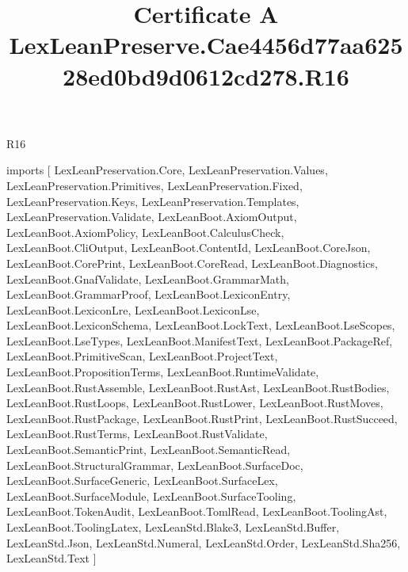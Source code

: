 \begin{lexlean}{R16}
\title{Certificate A LexLeanPreserve.Cae4456d77aa62528ed0bd9d0612cd278.R16}
\begin{coremodule}
imports [
  LexLeanPreservation.Core,
  LexLeanPreservation.Values,
  LexLeanPreservation.Primitives,
  LexLeanPreservation.Fixed,
  LexLeanPreservation.Keys,
  LexLeanPreservation.Templates,
  LexLeanPreservation.Validate,
  LexLeanBoot.AxiomOutput,
  LexLeanBoot.AxiomPolicy,
  LexLeanBoot.CalculusCheck,
  LexLeanBoot.CliOutput,
  LexLeanBoot.ContentId,
  LexLeanBoot.CoreJson,
  LexLeanBoot.CorePrint,
  LexLeanBoot.CoreRead,
  LexLeanBoot.Diagnostics,
  LexLeanBoot.GnafValidate,
  LexLeanBoot.GrammarMath,
  LexLeanBoot.GrammarProof,
  LexLeanBoot.LexiconEntry,
  LexLeanBoot.LexiconLre,
  LexLeanBoot.LexiconLse,
  LexLeanBoot.LexiconSchema,
  LexLeanBoot.LockText,
  LexLeanBoot.LseScopes,
  LexLeanBoot.LseTypes,
  LexLeanBoot.ManifestText,
  LexLeanBoot.PackageRef,
  LexLeanBoot.PrimitiveScan,
  LexLeanBoot.ProjectText,
  LexLeanBoot.PropositionTerms,
  LexLeanBoot.RuntimeValidate,
  LexLeanBoot.RustAssemble,
  LexLeanBoot.RustAst,
  LexLeanBoot.RustBodies,
  LexLeanBoot.RustLoops,
  LexLeanBoot.RustLower,
  LexLeanBoot.RustMoves,
  LexLeanBoot.RustPackage,
  LexLeanBoot.RustPrint,
  LexLeanBoot.RustSucceed,
  LexLeanBoot.RustTerms,
  LexLeanBoot.RustValidate,
  LexLeanBoot.SemanticPrint,
  LexLeanBoot.SemanticRead,
  LexLeanBoot.StructuralGrammar,
  LexLeanBoot.SurfaceDoc,
  LexLeanBoot.SurfaceGeneric,
  LexLeanBoot.SurfaceLex,
  LexLeanBoot.SurfaceModule,
  LexLeanBoot.SurfaceTooling,
  LexLeanBoot.TokenAudit,
  LexLeanBoot.TomlRead,
  LexLeanBoot.ToolingAst,
  LexLeanBoot.ToolingLatex,
  LexLeanStd.Blake3,
  LexLeanStd.Buffer,
  LexLeanStd.Json,
  LexLeanStd.Numeral,
  LexLeanStd.Order,
  LexLeanStd.Sha256,
  LexLeanStd.Text
]


\end{coremodule}
\end{lexlean}
